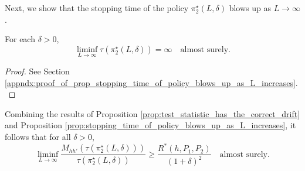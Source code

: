 Next, we show that the stopping time of the policy $\pi_2^\star(L, \delta)$ blows up as $L\to \infty$.
\begin{prop}
\label{prop:stopping_time_of_policy_blows_up_as_L_increases}
	For each $\delta>0$, 
	\begin{equation}
		\liminf\limits_{L \to \infty} \tau(\pi_2^\star(L, \delta))=\infty \quad \text{almost surely}.
		\label{eq:stopping_time_of_policy_blows_up_as_L_to_infty}
	\end{equation}
\end{prop}
\begin{proof}
	See Section \ref{appndx:proof_of_prop_stopping_time_of_policy_blows_up_as_L_increases}.
\end{proof}
Combining the results of Proposition \ref{prop:test_statistic_has_the_correct_drift} and Proposition \ref{prop:stopping_time_of_policy_blows_up_as_L_increases}, it follows that for all $\delta > 0$, 
\begin{equation}
	\liminf\limits_{L\to \infty}\frac{M_{hh'}(\tau(\pi_2^\star(L,\delta)))}{\tau(\pi_2^\star(L,\delta))}\geq\frac{R^*(h, P_1, P_2)}{(1+\delta)^2}\quad \text{almost surely}.
	\label{eq:combining_two_props}
\end{equation}

